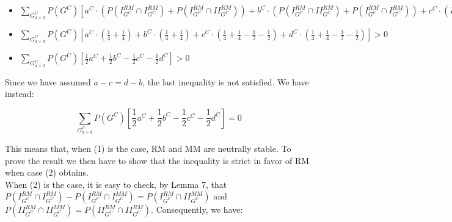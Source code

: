 \documentclass[fleqn,reqno,11pt]{article}
\begin{document}
\begin{itemize}

\item $\sum_{G_{a>d}^{C}} P(G^{C})[a^{C} \cdot (P(I_{G^{C}}^{RM}\cap I_{G^{C}}^{RM}) + P(I_{G^{C}}^{RM}\cap II_{G^{C}}^{RM})) + b^{C} \cdot  (P(I_{G^{C}}^{RM}\cap II_{G^{C}}^{RM}) + P(I_{G^{C}}^{RM}\cap I_{G^{C}}^{RM})) + c^{C} \cdot (P(II_{G^{C}}^{RM}\cap I_{G^{C}}^{RM}) +P(II_{G^{C}}^{RM}\cap II_{G^{C}}^{RM})- P(I_{G^{C}}^{RM}\cap II_{G^{C}}^{MM})- P(II_{G^{C}}^{RM}\cap II_{G^{C}}^{MM})) + d^{C} \cdot (P(II_{G^{C}}^{RM}\cap II_{G^{C}}^{RM})+P(II_{G^{C}}^{RM}\cap I_{G^{C}}^{RM})- P(II_{G^{C}}^{RM}\cap II_{G^{C}}^{MM})- P(I_{G^{C}}^{RM}\cap II_{G^{C}}^{MM}))]> 0$

\item $\sum_{G_{a>d}^{C}} P(G^{C})[a^{C} \cdot (\frac{1}{4}+\frac{1}{4}) + b^{C} \cdot  (\frac{1}{4}+\frac{1}{4}) + c^{C} \cdot (\frac{1}{4}+\frac{1}{4}-\frac{1}{2}-\frac{1}{2}) + d^{C} \cdot (\frac{1}{4}+\frac{1}{4}-\frac{1}{2}-\frac{1}{2})]> 0$

\item $\sum_{G_{a>d}^{C}} P(G^{C})[\frac{1}{2}a^{C}+ \frac{1}{2}b^{C} - \frac{1}{2}c^{C} - \frac{1}{2}d^{C}]> 0$

\end{itemize}

\noindent Since we have assumed $ a-c = d-b $, the last inequality is not satisfied. We have instead: 

$$ \sum_{G_{a>d}^{C}} P(G^{C})[\frac{1}{2}a^{C}+ \frac{1}{2}b^{C} - \frac{1}{2}c^{C} - \frac{1}{2}d^{C}]= 0 $$

\noindent This means that, when (1) is the case, RM and MM are neutrally stable. To prove the result we then have to show that the inequality is strict in favor of RM when case (2) obtains. \\
When (2) is the case, it is easy to check, by Lemma 7, that $P(I_{G^{C}}^{RM} \cap I_{G^{C}}^{RM})-P(I_{G^{C}}^{RM}\cap I_{G^{C}}^{MM})=P(I_{G^{C}}^{RM}\cap II_{G^{C}}^{MM})$
and $P(II_{G^{C}}^{RM}\cap II_{G^{C}}^{MM})=P(II_{G^{C}}^{RM} \cap II_{G^{C}}^{RM})$.
Consequently, we have:
\end{document}
